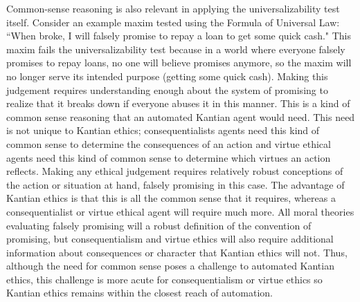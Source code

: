 \begin{isabellebody}
\begin{isamarkuptext}
Common-sense reasoning is also relevant in applying the universalizability test itself. Consider an example
maxim tested using the Formula of Universal Law: ``When broke, I will falsely promise to repay a loan
to get some quick cash." This maxim fails the universalizability test because in a world where everyone
falsely promises to repay loans, no one will believe promises anymore, so the maxim will no longer serve
its intended purpose (getting some quick cash). Making this judgement requires understanding enough about
the system of promising to realize that it breaks down if everyone abuses it in this manner. This is a
kind of common sense reasoning that an automated Kantian agent would need. This need is not unique to 
Kantian ethics; consequentialists agents need this kind of common sense to determine the consequences of 
an action and virtue ethical agents need this kind of common sense to determine which virtues an action
reflects. Making any ethical judgement requires relatively robust conceptions of the action or situation
at hand, falsely promising in this case. The advantage of Kantian ethics is that this is all the common 
sense that it requires, whereas a consequentialist or virtue ethical agent will require much more. All
moral theories evaluating falsely promising will a robust definition of the convention of promising, 
but consequentialism and virtue ethics will also require additional information about consequences or character
that Kantian ethics will not. Thus, although the need for common sense poses a challenge to automated
Kantian ethics, this challenge is more acute for consequentialism or virtue ethics so Kantian ethics remains
 within the closest reach of automation.%
\end{isamarkuptext}\isamarkuptrue%
%
\isadelimtheory
%
\endisadelimtheory
%
\isatagtheory
%
\endisatagtheory
{\isafoldtheory}%
%
\isadelimtheory
%
\endisadelimtheory
%
\end{isabellebody}%
\endinput
